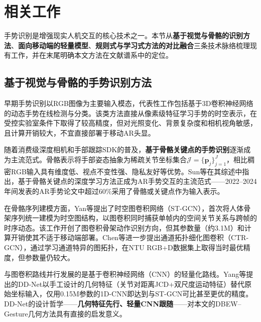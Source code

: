 
\section{相关工作}
\label{sec:gesture_related_work}

手势识别是增强现实人机交互的核心技术之一。本节从\textbf{基于视觉与骨骼的识别方法}、\textbf{面向移动端的轻量模型}、\textbf{规则式与学习式方法的对比融合}三条技术脉络梳理现有工作，并在末尾明确本文方法在文献谱系中的定位。

\subsection{基于视觉与骨骼的手势识别方法}

早期手势识别以RGB图像为主要输入模态，代表性工作包括基于3D卷积神经网络的动态手势在线检测与分类\cite{molchanov2016online_gesture}。该类方法直接从像素级特征学习手势的时空表示，在受控实验室条件下取得了较高精度，但对光照变化、背景复杂度和相机视角敏感，且计算开销较大，不宜直接部署于移动AR头显。

随着消费级深度相机和手部跟踪SDK的普及，\textbf{基于骨骼关键点的手势识别}逐渐成为主流范式。骨骼表示将手部姿态抽象为稀疏关节坐标集合$\mathcal{J}=\{\mathbf{p}_j\}_{j=1}^{J}$，相比稠密RGB输入具有维度低、视点不变性强、隐私友好等优势。Sun等\cite{sun2024ar_gesture_survey}在其综述中指出，基于骨骼关键点的深度学习方法正成为AR手势交互的主流范式——2022--2024年间发表的AR手势论文中超过60\%采用了骨骼或关键点作为输入表示。

在骨骼序列建模方面，Yan等\cite{yan2018stgcn}提出了时空图卷积网络（ST-GCN），首次将人体骨架序列统一建模为时空图结构，以图卷积同时捕获单帧内的空间关节关系与跨帧的时序动态。该工作开创了图卷积骨架动作识别方向，但其参数量（约3.1M）和计算开销使其不适于移动端部署。Chen等\cite{chen2021ctrgcn}进一步提出通道拓扑细化图卷积（CTR-GCN），通过学习通道特异的图拓扑，在NTU RGB+D数据集上取得当时最优精度，但参数量仍较大。

与图卷积路线并行发展的是基于卷积神经网络（CNN）的轻量化路线。Yang等\cite{yang2019ddnet}提出的DD-Net以手工设计的几何特征（关节对距离JCD+双尺度运动特征）替代原始坐标输入，仅用0.15M参数的1D-CNN即达到与ST-GCN可比甚至更优的精度。DD-Net的设计哲学——\textbf{几何特征先行、轻量CNN跟随}——对本文的DBEW--Gesture几何方法具有直接的启发意义。

